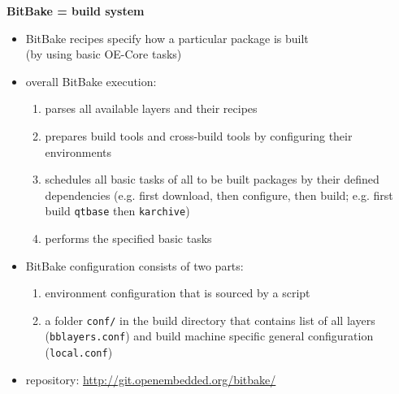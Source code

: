 \documentclass[ucs,9pt]{beamer}
\begin{document}
\begin{frame}[fragile]
    \textbf{BitBake = build system}
    \begin{itemize}
        \item BitBake recipes specify how a particular package is built\\
            (by using basic OE-Core tasks)
        \item overall BitBake execution:
        \begin{enumerate}
            \item parses all available layers and their recipes
            \item prepares build tools and cross-build tools by configuring their environments
            \item schedules all basic tasks of all to be built packages by their defined dependencies (e.g. first download, then configure, then build; e.g. first build \texttt{qtbase} then \texttt{karchive})
            \item performs the specified basic tasks
        \end{enumerate}
        \item BitBake configuration consists of two parts:
        \begin{enumerate}
            \item environment configuration that is sourced by a script
            \item a folder \texttt{conf/} in the build directory that contains list of all layers (\texttt{bblayers.conf}) and build machine specific general configuration (\texttt{local.conf})
        \end{enumerate}
        \item repository: \url{http://git.openembedded.org/bitbake/}
    \end{itemize}
\end{frame}
\end{document}
